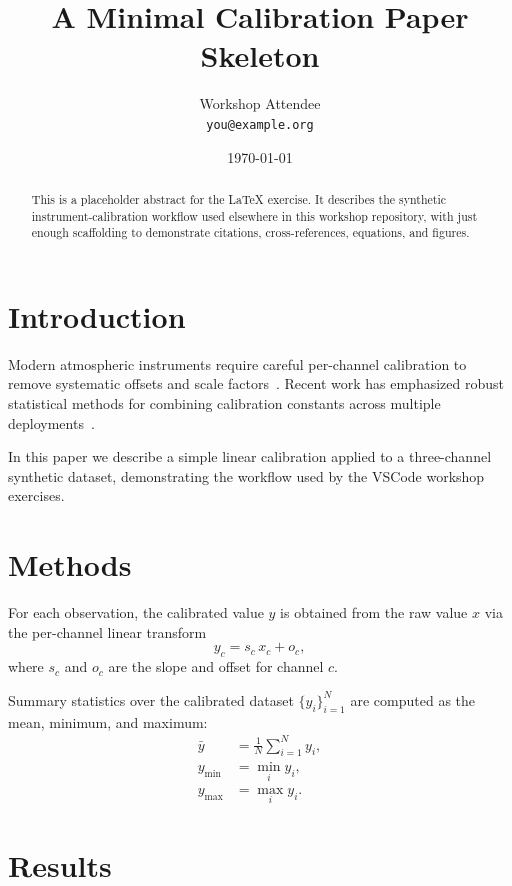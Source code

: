 \documentclass[11pt]{article}
\title{A Minimal Calibration Paper Skeleton}
\author{Workshop Attendee \\ \texttt{you@example.org}}
\date{\today}
\begin{document}
\maketitle

\begin{abstract}
This is a placeholder abstract for the LaTeX exercise. It describes the
synthetic instrument-calibration workflow used elsewhere in this workshop
repository, with just enough scaffolding to demonstrate citations,
cross-references, equations, and figures.
\end{abstract}

\section{Introduction}
\label{sec:intro}

Modern atmospheric instruments require careful per-channel calibration to
remove systematic offsets and scale factors~\cite{anderson2024calibration}.
Recent work has emphasized robust statistical methods for combining
calibration constants across multiple deployments~\cite{nguyen2023robust}.

In this paper we describe a simple linear calibration applied to a
three-channel synthetic dataset, demonstrating the workflow used by the
VSCode workshop exercises.

\section{Methods}
\label{sec:methods}

For each observation, the calibrated value $y$ is obtained from the raw
value $x$ via the per-channel linear transform
\begin{equation}
    y_c = s_c \, x_c + o_c,
    \label{eq:calibration}
\end{equation}
where $s_c$ and $o_c$ are the slope and offset for channel $c$.

Summary statistics over the calibrated dataset $\{y_i\}_{i=1}^{N}$ are
computed as the mean, minimum, and maximum:
\begin{align}
    \bar{y} &= \frac{1}{N} \sum_{i=1}^{N} y_i, \\
    y_{\min} &= \min_i y_i, \\
    y_{\max} &= \max_i y_i.
\end{align}

\section{Results}
\label{sec:results}
\end{document}
